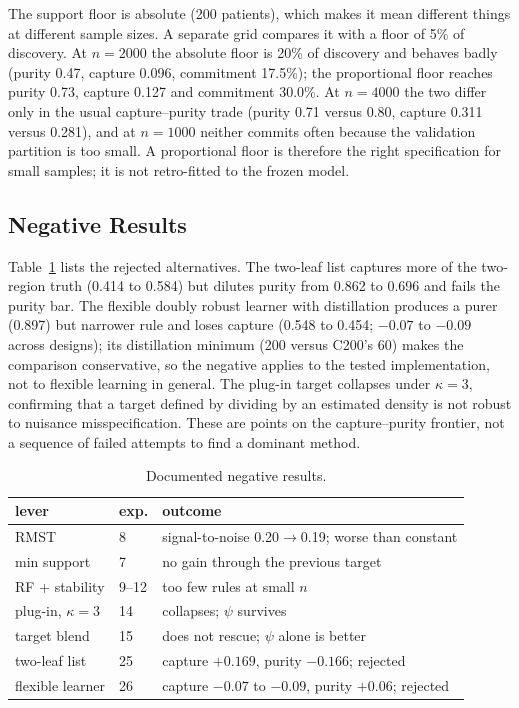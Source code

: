 \documentclass[conference]{IEEEtran}
\begin{document}
The support floor is absolute (200 patients), which makes it mean different
things at different sample sizes. A separate grid compares it with a floor of
5\% of discovery. At $n=2000$ the absolute floor is 20\% of discovery and
behaves badly (purity 0.47, capture 0.096, commitment 17.5\%); the proportional
floor reaches purity 0.73, capture 0.127 and commitment 30.0\%. At $n=4000$ the
two differ only in the usual capture--purity trade (purity 0.71 versus 0.80,
capture 0.311 versus 0.281), and at $n=1000$ neither commits often because the
validation partition is too small. A proportional floor is therefore the right
specification for small samples; it is not retro-fitted to the frozen model.

\subsection{Negative Results}

Table~\ref{tab:neg} lists the rejected alternatives. The two-leaf list captures
more of the two-region truth (0.414 to 0.584) but dilutes purity from 0.862 to
0.696 and fails the purity bar. The flexible doubly robust learner with
distillation produces a purer (0.897) but narrower rule and loses capture
(0.548 to 0.454; $-0.07$ to $-0.09$ across designs); its distillation minimum
(200 versus C200's 60) makes the comparison conservative, so the negative
applies to the tested implementation, not to flexible learning in general. The
plug-in target collapses under $\kappa=3$, confirming that a target defined by
dividing by an estimated density is not robust to nuisance misspecification.
These are points on the capture--purity frontier, not a sequence of failed
attempts to find a dominant method.

\begin{table}[t]
\caption{Documented negative results.}
\label{tab:neg}
\centering
\footnotesize
\setlength{\tabcolsep}{3pt}
\begin{tabular}{@{}p{}p{}p{}@{}}
\toprule
lever & exp. & outcome\\
\midrule
RMST & 8 & signal-to-noise 0.20$\to$0.19; worse than constant\\
min support & 7 & no gain through the previous target\\
RF + stability & 9--12 & too few rules at small $n$\\
plug-in, $\kappa=3$ & 14 & collapses; $\psi$ survives\\
target blend & 15 & does not rescue; $\psi$ alone is better\\
two-leaf list & 25 & capture $+0.169$, purity $-0.166$; rejected\\
flexible learner & 26 & capture $-0.07$ to $-0.09$, purity $+0.06$; rejected\\
\bottomrule
\end{tabular}
\end{table}
\end{document}
